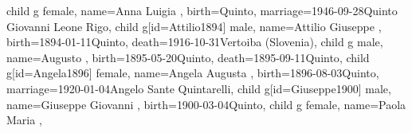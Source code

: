 \documentclass{article}
\begin{document}
\begin{midpage}
\begin{center}
\begin{genealogypicture}
{{{{{{{{{{{                                        }
                                        child{
                                            g{
                                                female,
                                                name={Anna Luigia },
                                                birth={Quinto}{},
                                                marriage={1946-09-28}{Quinto \newline Giovanni Leone Rigo},
                                            }
                                        }
                                    }
                                    child{
                                        g[id=Attilio1894]{
                                            male,
                                            name={Attilio Giuseppe },
                                            birth={1894-01-11}{Quinto},
                                            death={1916-10-31}{Vertoiba (Slovenia)},
                                        }
                                    }
                                    child{
                                        g{
                                            male,
                                            name={Augusto },
                                            birth={1895-05-20}{Quinto},
                                            death={1895-09-11}{Quinto},
                                        }
                                    }
                                    child{
                                        g[id=Angela1896]{
                                            female,
                                            name={Angela Augusta },
                                            birth={1896-08-03}{Quinto},
                                            marriage={1920-01-04}{Angelo Sante Quintarelli},
                                        }
                                    }
                                    child{
                                        g[id=Giuseppe1900]{
                                            male,
                                            name={Giuseppe Giovanni },
                                            birth={1900-03-04}{Quinto},
                                        }
                                    }
                                }
                                child{
                                    g{
                                        female,
                                        name={Paola Maria },
}}}}}}}}}}
\end{genealogypicture}
\end{center}
\end{midpage}
\end{document}
